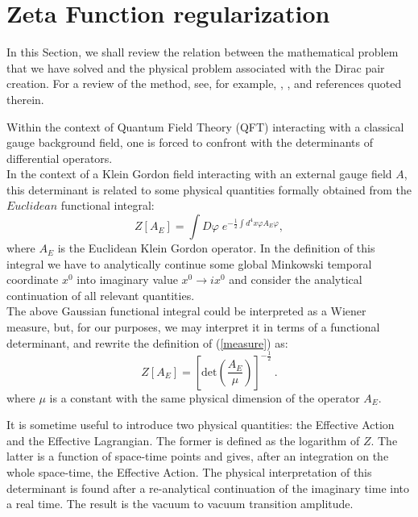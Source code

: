 \documentclass [11pt]{article}
\def\phi{\varphi}
\begin{document}
\section{Zeta Function regularization}

In this  Section, we shall review  
the relation between the mathematical problem that we have
solved and the physical problem associated with the  Dirac pair creation.
For a review of  the method, see, for example,
 \cite{7}, \cite{Moretti:1999rf}, \cite{Bytsenko:1996bc} and references quoted therein.

Within the context of Quantum Field Theory (QFT) interacting with a classical gauge background field, one is forced to confront with the determinants of 
differential operators.\\
In the context of a Klein Gordon field interacting with an external gauge field $A$, 
this determinant is related to some physical quantities formally obtained from the $Euclidean$ functional integral:
\begin{equation}
\label{measure}
Z[A_E]=\int D\phi \; e^{-\frac{1}{2} \int d^{4}x \phi A_E \phi},
\end{equation}
where $A_E$ is the Euclidean Klein Gordon operator.
In the definition of this integral we have to analytically continue some global Minkowski temporal coordinate $x^{0}$  into imaginary value $x^{0} \rightarrow ix^{0}$ and consider the analytical continuation of all relevant quantities. \\
The above Gaussian functional integral could be interpreted as a Wiener
 measure, but, 
for our purposes, we may  interpret it in terms of a functional determinant, and rewrite the 
definition of (\ref{measure}) as:
\begin{equation}
Z[A_{E}]=\left[ \mbox{det} \left( \frac{A_{E}}{\mu} \right) \right]^{-\frac{1}{2}} \: .
\end{equation}
where $\mu$ is a constant with the same physical dimension of the operator $A_E$.

It is sometime useful to introduce two physical quantities: the Effective Action and the Effective Lagrangian.
The former is defined  as the logarithm of $Z$. The latter is a function of space-time points
and gives, after an integration on the whole space-time, the Effective Action.
The physical interpretation of this determinant is found after a re-analytical continuation of the imaginary time into a real time.
The result is the vacuum to vacuum transition amplitude.\\ 
\end{document}
